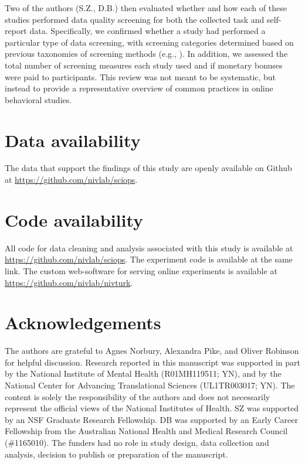 \documentclass[a4paper,notitlepage,12pt]{article}
\begin{document}
Two of the authors (S.Z., D.B.) then evaluated whether and how each of these studies performed data quality screening for both the collected task and self-report data. Specifically, we confirmed whether a study had performed a particular type of data screening, with screening categories determined based on previous taxonomies of screening methods (e.g., \cite{curran2016methods}). In addition, we assessed the total number of screening measures each study used and if monetary bonuses were paid to participants. This review was not meant to be systematic, but instead to provide a representative overview of common practices in online behavioral studies.

\section*{Data availability}

The data that support the findings of this study are openly available on Github at \url{https://github.com/nivlab/sciops}.

\section*{Code availability}

All code for data cleaning and analysis associated with this study is available at \url{https://github.com/nivlab/sciops}. The experiment code is available at the same link.  The custom web-software for serving online experiments is available at \url{https://github.com/nivlab/nivturk}. 

\section*{Acknowledgements}

The authors are grateful to Agnes Norbury, Alexandra Pike, and Oliver Robinson for helpful discussion. Research reported in this manuscript was supported in part by the National Institute of Mental Health (R01MH119511; YN), and by the National Center for Advancing Translational Sciences (UL1TR003017; YN). The content is solely the responsibility of the authors and does not necessarily represent the official views of the National Institutes of Health. SZ was supported by an NSF Graduate Research Fellowship. DB was supported by an Early Career Fellowship from the Australian National Health and Medical Research Council (\#1165010). The funders had no role in study design, data collection and analysis, decision to publish or preparation of the manuscript.
\end{document}
